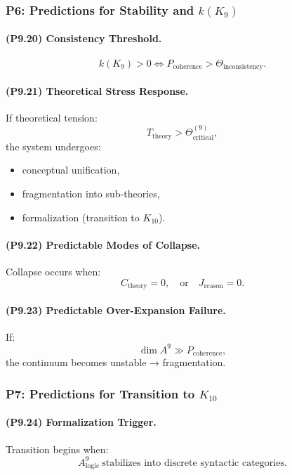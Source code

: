\subsubsection{P6: Predictions for Stability and \texorpdfstring{$k(K_9)$}{k(K_9)}}

\paragraph{(P9.20) Consistency Threshold.}
\[
k(K_9) > 0
\iff
P_{\mathrm{coherence}} > \Theta_{\mathrm{inconsistency}}.
\]

\paragraph{(P9.21) Theoretical Stress Response.}
If theoretical tension:
\[
T_{\mathrm{theory}} > \Theta_{\mathrm{critical}}^{(9)},
\]
the system undergoes:
\begin{itemize}
    \item conceptual unification,
    \item fragmentation into sub-theories,
    \item formalization (transition to $K_{10}$).
\end{itemize}

\paragraph{(P9.22) Predictable Modes of Collapse.}
Collapse occurs when:
\[
C_{\mathrm{theory}} = 0,
\quad \text{or} \quad
J_{\mathrm{reason}} = 0.
\]

\paragraph{(P9.23) Predictable Over-Expansion Failure.}
If:
\[
\dim A^9 \gg P_{\mathrm{coherence}},
\]
the continuum becomes unstable → fragmentation.

\subsubsection{P7: Predictions for Transition to $K_{10}$}

\paragraph{(P9.24) Formalization Trigger.}
Transition begins when:
\[
A_{\mathrm{logic}}^9
\ \text{stabilizes into discrete syntactic categories}.
\]

